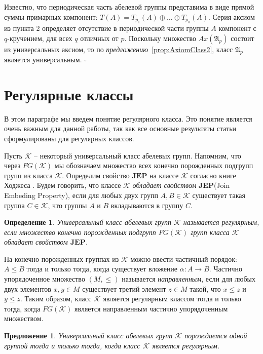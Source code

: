 \documentclass[a4paper,11pt,twoside]{article}
\newtheorem{proposition}{Предложение}[section]
\newtheorem{definition}{Определение}[section]
\def\A{{\mathfrak{A}}}
\def\K{{\mathcal{K}}}
\def\JEP{{\textbf{JEP}}}
\begin{document}
Известно, что периодическая часть абелевой группы представима в виде прямой суммы примарных компонент: $T(A) = T_{p_1}(A) \oplus \ldots \oplus T_{p_k}(A)$. Серия аксиом из пункта 2 определяет отсутствие в периодической части группы $A$ компонент с $q$-кручением, для всех $q$ отличных от $p$. Поскольку множество $Ax(\A_p)$ состоит из универсальных аксиом, то по \textit{предложению}~\ref{prop:AxiomClass2}, класс $\A_p$ является универсальным.
$\square$




\section{Регулярные классы}

В этом параграфе мы введем понятие регулярного класса. Это понятие является очень важным для данной работы, так как все основные результаты статьи сформулированы для регулярных классов.

Пусть $\K$ -- некоторый универсальный класс абелевых групп. Напомним, что через $FG(\K)$ мы обозначаем множество всех конечно порожденных подгрупп групп из класса $\K$. Определим свойство $\JEP$ на классе $\K$ согласно книге Ходжеса \cite{Hodges}. Будем говорить, что классе $\K$ \textit{обладает свойством} \JEP  (Join Embeding Property), если для любых двух групп $A, B \in \K$ существует такая группа $C \in \K$, что группы $A$ и $B$ вкладываются в группу $C$.


\begin{definition}
Универсальный класс абелевых групп $\K$ называется регулярным, если множество конечно порожденных подгрупп $FG(\K)$ групп класса $\K$ обладает свойством $\JEP$.
\end{definition}

На конечно порожденных группах из $\K$ можно ввести частичный порядок: $A \le B$ тогда и только тогда, когда существует вложение $\alpha: A \rightarrow B$. Частично упорядоченное множество $(M, \le)$ называется \textit{направленным}, если для любых двух элементов $x, y \in M$ существует третий элемент $z \in M$ такой, что $x \le z$ и $y \le z$. Таким образом, класс $\K$ является регулярным классом тогда и только тогда, когда $FG(\K)$ является направленным частично упорядоченным множеством.

\begin{proposition}
Универсальный класс абелевых групп $\K$ порождается одной группой тогда и только тогда, когда класс $\K$ является регулярным.
\end{proposition}
\end{document}
